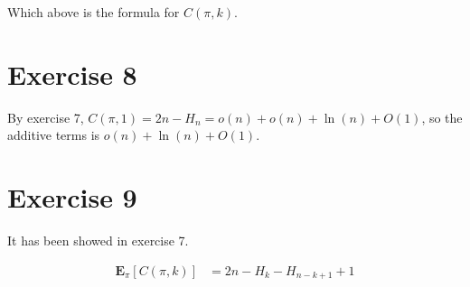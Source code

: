 \documentclass[
]{article}
\begin{document}
Which above is the formula for \(C(\pi,k)\).

\hypertarget{exercise-8}{%
\section{Exercise 8}\label{exercise-8}}

By exercise 7, \(C(\pi,1)=2n-H_{n}=o(n)+o(n)+\ln(n)+O(1)\), so the
additive terms is \(o(n)+\ln(n)+O(1)\).

\hypertarget{exercise-9}{%
\section{Exercise 9}\label{exercise-9}}

It has been showed in exercise 7.

\[\begin{aligned}
\mathbf{E}_{\pi}[C(\pi,k)]&=2n-H_{k}-H_{n-k+1}+1
\end{aligned}\]
\end{document}
